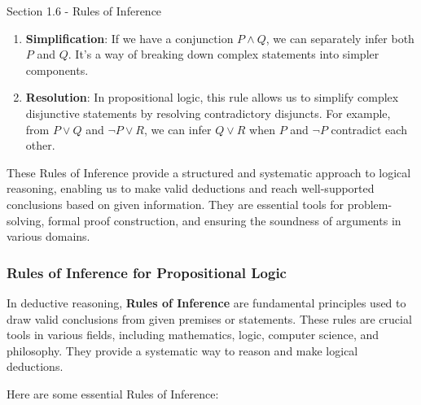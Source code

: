 \begin{notes}{Section 1.6 - Rules of Inference}
\begin{enumerate}
        \item \textbf{Simplification}: If we have a conjunction \(P \land Q\), we can separately infer both \(P\) and \(Q\). It's a way of breaking down complex statements into simpler components.
        
        \item \textbf{Resolution}: In propositional logic, this rule allows us to simplify complex disjunctive statements by resolving contradictory disjuncts. For example, from \(P \lor Q\) and \(\neg P \lor R\), we can infer \(Q \lor R\) when \(P\) and \(\neg P\) contradict each other.
    \end{enumerate}
    
    These Rules of Inference provide a structured and systematic approach to logical reasoning, enabling us to make valid deductions and reach well-supported conclusions based on given information. They are essential tools for problem-solving, formal proof construction, and ensuring the soundness of arguments in various domains.

    \subsubsection*{Rules of Inference for Propositional Logic}

    In deductive reasoning, \textbf{Rules of Inference} are fundamental principles used to draw valid conclusions from given premises or statements. These rules are crucial tools in various fields, including mathematics, logic, computer science, and philosophy. They provide a systematic way to reason and make logical deductions.
    
    Here are some essential Rules of Inference:
    

\end{notes}
